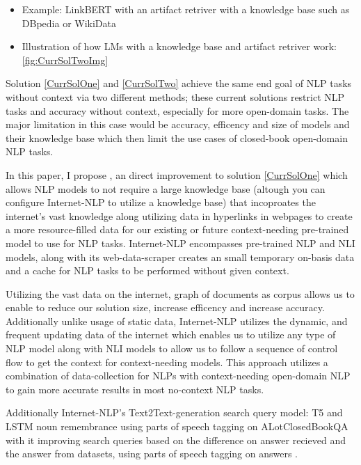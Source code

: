 \begin{enumerate}[leftmargin=1em]
\begin{itemize}[leftmargin=1em]
            \item Example: LinkBERT \cite{https://doi.org/10.48550/arxiv.2203.15827} with an artifact retriver \cite{https://doi.org/10.48550/arxiv.2201.09651} with a knowledge base such as DBpedia or WikiData \cite{10.5555/1785162.1785216, 10.1145/2629489}
            \item Illustration of how LMs with a knowledge base and artifact retriver work: \ref{fig:CurrSolTwoImg}
        \end{itemize}
\end{enumerate}

Solution \ref{CurrSolOne} and \ref{CurrSolTwo} achieve the same end goal of NLP tasks without context via two different methods; these current solutions restrict NLP tasks and accuracy without context, especially for more open-domain tasks. The major limitation in this case would be accuracy, efficency and size of models and their knowledge base which then limit the use cases of closed-book open-domain NLP tasks.

In this paper, I propose \inlp, an direct improvement to solution \ref{CurrSolOne} which allows NLP models to not require a large knowledge base (altough you can configure Internet-NLP to utilize a knowledge base) that incoproates the internet's vast knowledge along utilizing data in hyperlinks in webpages \cite{https://doi.org/10.48550/arxiv.2203.15827} to create a more resource-filled data for our existing or future context-needing pre-trained model to use for NLP tasks. Internet-NLP encompasses pre-trained NLP and NLI models, along with its web-data-scraper creates an small temporary on-basis data and a cache for NLP tasks to be performed without given context.

Utilizing the vast data on the internet, graph of documents as corpus \cite{https://doi.org/10.48550/arxiv.2203.15827} allows us to enable to reduce our solution size, increase efficency and increase accuracy. Additionally unlike usage of static data, Internet-NLP utilizes the dynamic, and frequent updating data of the internet which enables us to utilize any type of NLP model along with NLI models to allow us to follow a sequence of control flow to get the context for context-needing models. This approach utilizes a combination of data-collection \cite{inbook} for NLPs with context-needing open-domain NLP to gain more accurate results in most no-context NLP tasks.

Additionally Internet-NLP's Text2Text-generation search query model: T5 \cite{https://doi.org/10.48550/arxiv.1910.10683} and LSTM noun remembrance using parts of speech tagging \cite{Chiche2022} on ALotClosedBookQA with it improving search queries based on the difference on answer recieved and the answer from datasets, using parts of speech tagging on answers \cite{Chiche2022}.
